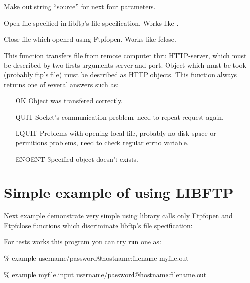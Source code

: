 {Make out string ``source'' for next four parameters.}

{
	Open file specified in libftp's file specification. Works like 
	. 
}

{
	Close file which opened using Ftpfopen. Works like fclose.
}


\label{FtpHttpGet}
{
 This function transfers file from remote computer thru HTTP-server, which must
be described by two firsts arguments server and port. Object which must be took
(probably ftp's file) must be described as HTTP objects. This function always returns
one of several answers such as:

\begin{itemize}
\item[OK] Object was transfered correctly.
\item[QUIT] Socket's communication problem, need to repeat request again.
\item[LQUIT] Problems with opening local file, 
             probably no disk space or permitions problems, need to check regular errno
		variable.
\item[ENOENT] Specified object doesn't exists.
\end{itemize}
}


\section{Simple example of using LIBFTP}

Next example demonstrate very simple using library calls only Ftpfopen 
and Ftpfclose functions which discriminate libftp's file specification:



For tests works this program you can try run one as:

\bigskip

\% example username/password@hostname:filename myfile.out

\% example myfile.input username/password@hostname:filename.out


\newpage

\newpage
\tableofcontents













